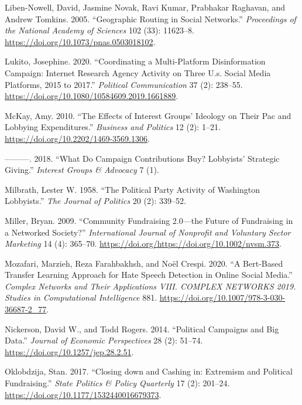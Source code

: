 \documentclass[12pt,]{article}
\begin{document}
\leavevmode\hypertarget{ref-liben2005}{}%
Liben-Nowell, David, Jasmine Novak, Ravi Kumar, Prabhakar Raghavan, and
Andrew Tomkins. 2005. ``Geographic Routing in Social Networks.''
\emph{Proceedings of the National Academy of Sciences} 102 (33):
11623--8. \url{https://doi.org/10.1073/pnas.0503018102}.

\leavevmode\hypertarget{ref-lukito2020}{}%
Lukito, Josephine. 2020. ``Coordinating a Multi-Platform Disinformation
Campaign: Internet Research Agency Activity on Three U.s. Social Media
Platforms, 2015 to 2017.'' \emph{Political Communication} 37 (2):
238--55. \url{https://doi.org/10.1080/10584609.2019.1661889}.

\leavevmode\hypertarget{ref-mckay2010}{}%
McKay, Amy. 2010. ``The Effects of Interest Groups' Ideology on Their
Pac and Lobbying Expenditures.'' \emph{Business and Politics} 12 (2):
1--21. \url{https://doi.org/10.2202/1469-3569.1306}.

\leavevmode\hypertarget{ref-mckay2018}{}%
---------. 2018. ``What Do Campaign Contributions Buy? Lobbyists'
Strategic Giving.'' \emph{Interest Groups \& Advocacy} 7 (1).

\leavevmode\hypertarget{ref-milbrath1958}{}%
Milbrath, Lester W. 1958. ``The Political Party Activity of Washington
Lobbyists.'' \emph{The Journal of Politics} 20 (2): 339--52.

\leavevmode\hypertarget{ref-miller2009}{}%
Miller, Bryan. 2009. ``Community Fundraising 2.0---the Future of
Fundraising in a Networked Society?'' \emph{International Journal of
Nonprofit and Voluntary Sector Marketing} 14 (4): 365--70.
\url{https://doi.org/https://doi.org/10.1002/nvsm.373}.

\leavevmode\hypertarget{ref-mozafari2020}{}%
Mozafari, Marzieh, Reza Farahbakhsh, and Noël Crespi. 2020. ``A
Bert-Based Transfer Learning Approach for Hate Speech Detection in
Online Social Media.'' \emph{Complex Networks and Their Applications
VIII. COMPLEX NETWORKS 2019. Studies in Computational Intelligence} 881.
\url{https://doi.org/10.1007/978-3-030-36687-2_77}.

\leavevmode\hypertarget{ref-nickerson2014}{}%
Nickerson, David W., and Todd Rogers. 2014. ``Political Campaigns and
Big Data.'' \emph{Journal of Economic Perspectives} 28 (2): 51--74.
\url{https://doi.org/10.1257/jep.28.2.51}.

\leavevmode\hypertarget{ref-oklobdzija2017}{}%
Oklobdzija, Stan. 2017. ``Closing down and Cashing in: Extremism and
Political Fundraising.'' \emph{State Politics \& Policy Quarterly} 17
(2): 201--24. \url{https://doi.org/10.1177/1532440016679373}.
\end{document}
